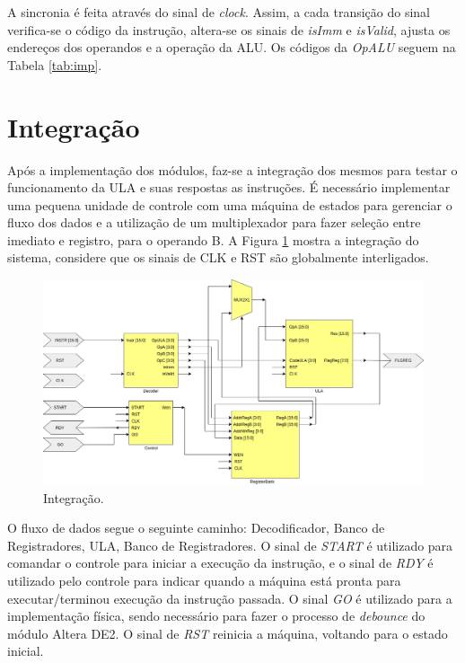 \documentclass[11pt,a4paper,titlepage]{article}
\begin{document}
A sincronia é feita através do sinal de \textit{clock}. Assim, a cada transição do sinal verifica-se o código da instrução, altera-se os sinais de \textit{isImm} e \textit{isValid}, ajusta os endereços dos operandos e a operação da ALU. Os códigos da \textit{OpALU} seguem na Tabela \ref{tab:imp}.

\section{Integração}

Após a implementação dos módulos, faz-se a integração dos mesmos para testar o funcionamento da ULA e suas respostas as instruções. É necessário implementar uma pequena unidade de controle com uma máquina de estados para gerenciar o fluxo dos dados e a utilização de um multiplexador para fazer seleção entre imediato e registro, para o operando B. A Figura \ref{fig:blocomicro} mostra a integração do sistema, considere que os sinais de CLK e RST são globalmente interligados.

\begin{figure}[h]
\centering
\includegraphics[scale=0.4]{images/Microprocessor.png}
\caption{Integração.}
\label{fig:blocomicro}
\end{figure}

O fluxo de dados segue o seguinte caminho: Decodificador, Banco de Registradores, ULA, Banco de Registradores. O sinal de \textit{START} é utilizado para comandar o controle para iniciar a execução da instrução, e o sinal de \textit{RDY} é utilizado pelo controle para indicar quando a máquina está pronta para executar/terminou execução da instrução passada. O sinal \textit{GO} é utilizado para a implementação física, sendo necessário para fazer o processo de \textit{debounce} do módulo Altera DE2. O sinal de \textit{RST} reinicia a máquina, voltando para o estado inicial.
\end{document}
